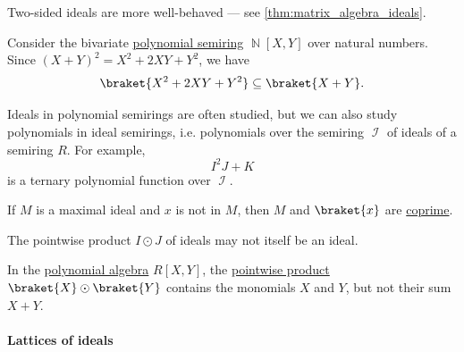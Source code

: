 \begin{example}
\begin{thmenum}
    Two-sided ideals are more well-behaved --- see \cref{thm:matrix_algebra_ideals}.

     Consider the bivariate \hyperref[def:polynomial_algebra]{polynomial semiring} \( \BbbN[X, Y] \) over natural numbers. Since \( (X + Y)^2 = X^2 + 2XY + Y^2 \), we have
    \begin{equation*}
      \braket{ X^2 + 2XY + Y^2 } \subseteq \braket{ X + Y }.
    \end{equation*}

     Ideals in polynomial semirings are often studied, but we can also study polynomials in ideal semirings, i.e. polynomials over the semiring \( \mscrI \) of ideals of a semiring \( R \). For example,
    \begin{equation*}
      I^2 J + K
    \end{equation*}
    is a ternary polynomial function over \( \mscrI \).

     If \( M \) is a maximal ideal and \( x \) is not in \( M \), then \( M \) and \( \braket{ x } \) are \hyperref[def:semiring_ideal/coprime]{coprime}.

     The pointwise product \( I \odot J \) of ideals may not itself be an ideal.

    In the \hyperref[def:polynomial_algebra]{polynomial algebra} \( R[X, Y] \), the \hyperref[def:power_semigroup]{pointwise product} \( \braket{ X } \odot \braket{ Y } \) contains the monomials \( X \) and \( Y \), but not their sum \( X + Y \).
  \end{thmenum}
\end{example}

\paragraph{Lattices of ideals}

